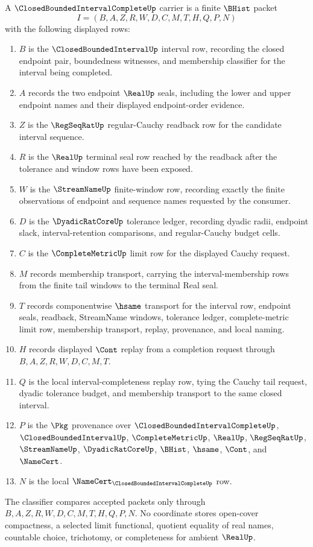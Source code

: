 \begin{definition}
\label{def:closed-bounded-interval-complete-carrier}
A $\ClosedBoundedIntervalCompleteUp$ carrier is a finite $\BHist$ packet
$$
I=(B,A,Z,R,W,D,C,M,T,H,Q,P,N)
$$
with the following displayed rows:
\begin{enumerate}
\item $B$ is the $\ClosedBoundedIntervalUp$ interval row, recording the closed endpoint pair, boundedness witnesses, and membership classifier for the interval being completed.
\item $A$ records the two endpoint $\RealUp$ seals, including the lower and upper endpoint names and their displayed endpoint-order evidence.
\item $Z$ is the $\RegSeqRatUp$ regular-Cauchy readback row for the candidate interval sequence.
\item $R$ is the $\RealUp$ terminal seal row reached by the readback after the tolerance and window rows have been exposed.
\item $W$ is the $\StreamNameUp$ finite-window row, recording exactly the finite observations of endpoint and sequence names requested by the consumer.
\item $D$ is the $\DyadicRatCoreUp$ tolerance ledger, recording dyadic radii, endpoint slack, interval-retention comparisons, and regular-Cauchy budget cells.
\item $C$ is the $\CompleteMetricUp$ limit row for the displayed Cauchy request.
\item $M$ records membership transport, carrying the interval-membership rows from the finite tail windows to the terminal Real seal.
\item $T$ records componentwise $\hsame$ transport for the interval row, endpoint seals, readback, StreamName windows, tolerance ledger, complete-metric limit row, membership transport, replay, provenance, and local naming.
\item $H$ records displayed $\Cont$ replay from a completion request through $B,A,Z,R,W,D,C,M,T$.
\item $Q$ is the local interval-completeness replay row, tying the Cauchy tail request, dyadic tolerance budget, and membership transport to the same closed interval.
\item $P$ is the $\Pkg$ provenance over $\ClosedBoundedIntervalCompleteUp$, $\ClosedBoundedIntervalUp$, $\CompleteMetricUp$, $\RealUp$, $\RegSeqRatUp$, $\StreamNameUp$, $\DyadicRatCoreUp$, $\BHist$, $\hsame$, $\Cont$, and $\NameCert$.
\item $N$ is the local $\NameCert_{\ClosedBoundedIntervalCompleteUp}$ row.
\end{enumerate}
The classifier compares accepted packets only through $B,A,Z,R,W,D,C,M,T,H,Q,P,N$. No coordinate stores open-cover compactness, a selected limit functional, quotient equality of real names, countable choice, trichotomy, or completeness for ambient $\RealUp$.
\end{definition}

